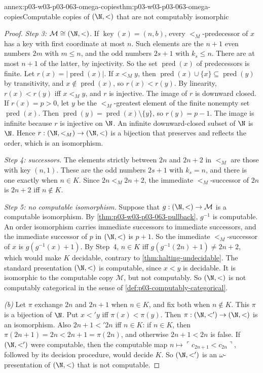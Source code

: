 \begin{annexitem}{annex:p03-w03-p03-063-omega-copies}{thm:p03-w03-p03-063-omega-copies}{Computable copies of \((\N,<)\) that are not computably isomorphic}
\begin{proof}
\emph{Step 3: \(\mathcal M\cong(\N,<)\).}  If
\(\operatorname{key}(x)=(n,b)\), every \(<_M\)-predecessor of \(x\) has a key
with first coordinate at most \(n\).  Such elements are the \(n+1\) even
numbers \(2m\) with \(m\leq n\), and the odd numbers \(2s+1\) with
\(k_s\leq n\).  There are at most \(n+1\) of the latter, by injectivity.  So
the set \(\operatorname{pred}(x)\) of predecessors is finite.  Let
\(r(x)=|\operatorname{pred}(x)|\).  If \(x<_My\), then
\(\operatorname{pred}(x)\cup\{x\}\subseteq\operatorname{pred}(y)\) by
transitivity, and \(x\notin\operatorname{pred}(x)\), so \(r(x)<r(y)\).  By
linearity, \(r(x)<r(y)\) iff \(x<_My\), and \(r\) is injective.  The image of
\(r\) is downward closed.  If \(r(x)=p>0\), let \(y\) be the
\(<_M\)-greatest element of the finite nonempty set
\(\operatorname{pred}(x)\).  Then
\(\operatorname{pred}(y)=\operatorname{pred}(x)\setminus\{y\}\), so
\(r(y)=p-1\).  The image is infinite because \(r\) is injective on \(\N\).
An infinite downward-closed subset of \(\N\) is \(\N\).  Hence
\(r:(\N,<_M)\to(\N,<)\) is a bijection that preserves and reflects the order,
which is an isomorphism.

\emph{Step 4: successors.}  The elements strictly between \(2n\) and
\(2n+2\) in \(<_M\) are those with key \((n,1)\).  These are the odd numbers
\(2s+1\) with \(k_s=n\), and there is one exactly when \(n\in K\).  Since
\(2n<_M2n+2\), the immediate \(<_M\)-successor of \(2n\) is \(2n+2\) iff
\(n\notin K\).

\emph{Step 5: no computable isomorphism.}  Suppose that
\(g:(\N,<)\to\mathcal M\) is a computable isomorphism.  By
\cref{thm:p03-w03-p03-063-pullback}, \(g^{-1}\) is computable.  An order
isomorphism carries immediate successors to immediate successors, and the
immediate successor of \(p\) in \((\N,<)\) is \(p+1\).  So the immediate
\(<_M\)-successor of \(x\) is \(g(g^{-1}(x)+1)\).  By Step~4,
\(n\in K\) iff \(g(g^{-1}(2n)+1)\neq2n+2\), which would make \(K\) decidable,
contrary to \cref{thm:halting-undecidable}.  The standard presentation
\((\N,<)\) is computable, since \(x<y\) is decidable.  It is isomorphic to
the computable copy \(\mathcal M\), but not computably.  So \((\N,<)\) is not
computably categorical in the sense of \cref{def:p03-computably-categorical}.

\emph{(b)}  Let \(\pi\) exchange \(2n\) and \(2n+1\) when \(n\in K\), and fix
both when \(n\notin K\).  This \(\pi\) is a bijection of \(\N\).  Put
\(x<'y\) iff \(\pi(x)<\pi(y)\).  Then
\(\pi:(\N,<')\to(\N,<)\) is an isomorphism.  Also \(2n+1<'2n\) iff
\(n\in K\): if \(n\in K\), then \(\pi(2n+1)=2n<2n+1=\pi(2n)\), and otherwise
\(2n+1<2n\) is false.  If \((\N,<')\) were computable, then the computable
map \(n\mapsto\ulcorner c_{2n+1}<c_{2n}\urcorner\), followed by its decision
procedure, would decide \(K\).  So \((\N,<')\) is an \(\omega\)-presentation
of \((\N,<)\) that is not computable.
\end{proof}
\end{annexitem}
